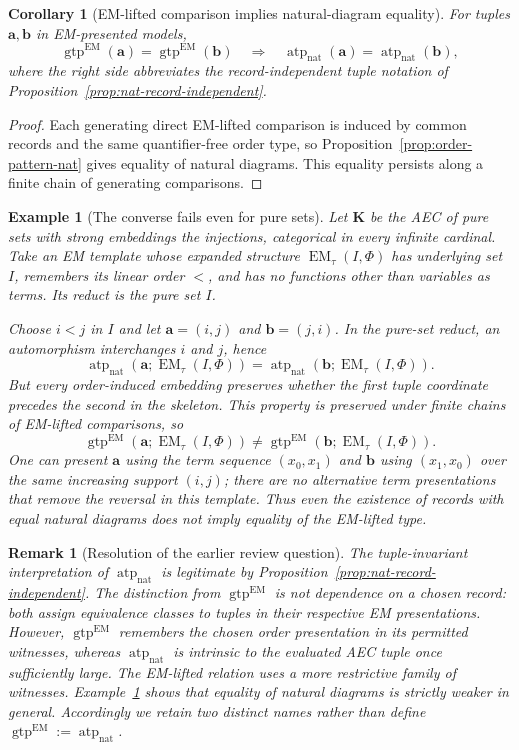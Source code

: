 \documentclass[11pt]{article}
\newcommand{\K}{\mathbf K}
\newcommand{\natatp}{\operatorname{atp}_{\mathrm{nat}}}
\newcommand{\gtp}{\operatorname{gtp}}
\newcommand{\EM}{\operatorname{EM}_{\tau}}
\newcommand{\ba}{\mathbf{a}}
\newcommand{\bb}{\mathbf{b}}
\theoremstyle{plain}
\newtheorem{corollary}[definition]{Corollary}
\newtheorem{remark}[definition]{Remark}
\newtheorem{example}[definition]{Example}
\begin{document}
\begin{corollary}[EM-lifted comparison implies natural-diagram equality]
\label{cor:gtpem-to-nat}
For tuples $\ba,\bb$ in EM-presented models,
\[
\gtp^{\mathrm{EM}}(\ba)=\gtp^{\mathrm{EM}}(\bb)
\quad\Longrightarrow\quad
\natatp(\ba)=\natatp(\bb),
\]
where the right side abbreviates the record-independent
tuple notation of Proposition~\ref{prop:nat-record-independent}.
\end{corollary}
\begin{proof}
Each generating direct EM-lifted comparison is induced
by common records and the same quantifier-free order
type, so Proposition~\ref{prop:order-pattern-nat}
gives equality of natural diagrams. This equality
persists along a finite chain of generating comparisons.
\end{proof}

\begin{example}[The converse fails even for pure sets]
\label{ex:pure-sets-order}
Let $\K$ be the AEC of pure sets with strong
embeddings the injections, categorical in
every infinite cardinal. Take an EM template
whose expanded structure $\operatorname{EM}_{\tau}(I,\Phi)$
has underlying set $I$, remembers its linear
order $<$, and has no functions other than
variables as terms. Its reduct is the pure set $I$.

Choose $i<j$ in $I$ and let
$\ba=(i,j)$ and $\bb=(j,i)$.
In the pure-set reduct, an automorphism
interchanges $i$ and $j$, hence
\[
\natatp(\ba;\EM(I,\Phi))
=\natatp(\bb;\EM(I,\Phi)).
\]
But every order-induced embedding preserves
whether the first tuple coordinate precedes
the second in the skeleton. This property
is preserved under finite chains of
EM-lifted comparisons, so
\[
\gtp^{\mathrm{EM}}(\ba;\EM(I,\Phi))
\ne
\gtp^{\mathrm{EM}}(\bb;\EM(I,\Phi)).
\]
One can present $\ba$ using the term sequence
$(x_0,x_1)$ and $\bb$ using $(x_1,x_0)$
over the same increasing support $(i,j)$;
there are no alternative term presentations
that remove the reversal in this template.
Thus even the \emph{existence} of records
with equal natural diagrams does not imply
equality of the EM-lifted type.
\end{example}

\begin{remark}[Resolution of the earlier review question]
The tuple-invariant interpretation of
$\natatp$ is legitimate by
Proposition~\ref{prop:nat-record-independent}.
The distinction from $\gtp^{\mathrm{EM}}$
is not dependence on a chosen record:
both assign equivalence classes to tuples in their
respective EM presentations. However,
$\gtp^{\mathrm{EM}}$ remembers the chosen order
presentation in its permitted witnesses, whereas
$\natatp$ is intrinsic to the evaluated
AEC tuple once sufficiently large.
The EM-lifted relation uses a more restrictive
family of witnesses. Example~\ref{ex:pure-sets-order}
shows that equality of natural diagrams is
strictly weaker in general. Accordingly we
retain two distinct names rather than define
$\gtp^{\mathrm{EM}}:=\natatp$.
\end{remark}
\end{document}
